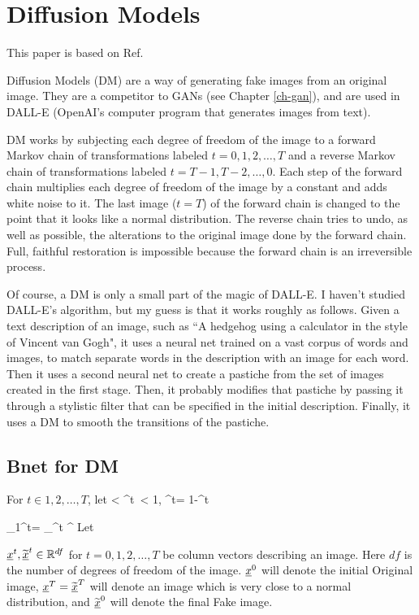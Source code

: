 \chapter{Diffusion Models}
\label{ch-diffusion}
\newcommand{\prodalp}[0]{\pi_1^t\alp}

This paper is based on
 Ref.\cite{weng-diffusion-model}

Diffusion Models (DM)
are a way of generating 
fake images from an
original image.
They are a competitor 
to GANs (see Chapter \ref{ch-gan}),
and are used in DALL-E 
(OpenAI's 
computer program
that generates images from text).


DM works by
subjecting
each degree of freedom 
of the image 
to a forward Markov
chain
of transformations
labeled $t=0, 1, 2, \ldots, T$
and a reverse Markov
chain of transformations
labeled $t=T-1, T-2, \ldots,
0$.
Each step
of the forward chain
multiplies each degree
of freedom
of the image by a constant
and adds white noise
to it.
The last  image  ($t=T$)
of the forward chain is
changed to the
point that it looks
like a normal distribution.
The reverse chain tries
to undo,
as well as possible, the alterations
to the original image
done by the forward chain.
Full, faithful restoration
is impossible
because the
forward chain
is an irreversible 
process.

Of course, a DM
is only a small part of the magic of DALL-E. I haven't
studied DALL-E's algorithm,
but my guess is that it works roughly as follows.
Given a text description
of an image, such as  
``A hedgehog using a calculator
in the style of Vincent van Gogh",
it uses a neural net
trained on a vast corpus of 
words and images, to match
separate words in the description
 with an image
 for each word.
Then it uses a second neural net
to create a pastiche from
the set of images created in the first
stage. Then, it 
probably modifies
that pastiche
by passing it
through a stylistic filter
that can be specified
in the initial description.
Finally, it uses a DM
to smooth the transitions of the pastiche.



\section{Bnet for DM}

For $t\in 1,2, \ldots , T$, let
< \alp^t\
< 1, \; \beta^t= 1-\alp^t
\eeq

\beq
\prodalp= \prod_{\tau=1}^t \alp^\tau
\eeq
Let 

${\underline{x}}^t, \widetilde{{\underline{x}}}^t\in { \mathbb{R}}^{df}$ for $t=0, 1, 2,
\ldots, T$ be column vectors
describing an image. Here $df$
is the number of degrees of freedom 
of the image. ${\underline{x}}^0$ 
will denote the initial Original image,
${\underline{x}}^T=\widetilde{{\underline{x}}}^T$
will denote an image which 
is very close to a 
normal distribution,
and $\widetilde{{\underline{x}}}^0$
will denote the final Fake image.

